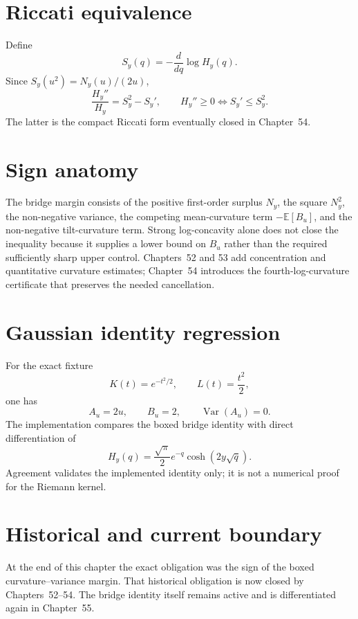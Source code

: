 \section{Riccati equivalence}
Define
\[
S_y(q)=-\frac{d}{dq}\log H_y(q).
\]
Since $S_y(u^2)=N_y(u)/(2u)$,
\[
\boxed{\frac{H_y''}{H_y}=S_y^2-S_y'},
\qquad
\boxed{H_y''\ge0\iff S_y'\le S_y^2.}
\]
The latter is the compact Riccati form eventually closed in Chapter~54.

\section{Sign anatomy}
The bridge margin consists of the positive first-order surplus $N_y$, the square $N_y^2$, the non-negative variance, the competing mean-curvature term $-\mathbb E[B_u]$, and the non-negative tilt-curvature term. Strong log-concavity alone does not close the inequality because it supplies a lower bound on $B_u$ rather than the required sufficiently sharp upper control. Chapters~52 and 53 add concentration and quantitative curvature estimates; Chapter~54 introduces the fourth-log-curvature certificate that preserves the needed cancellation.

\section{Gaussian identity regression}
For the exact fixture
\[
K(t)=e^{-t^2/2},\qquad L(t)=\frac{t^2}{2},
\]
one has
\[
A_u=2u,\qquad B_u=2,\qquad\operatorname{Var}(A_u)=0.
\]
The implementation compares the boxed bridge identity with direct differentiation of
\[
H_y(q)=\frac{\sqrt\pi}{2}e^{-q}\cosh(2y\sqrt q).
\]
Agreement validates the implemented identity only; it is not a numerical proof for the Riemann kernel.

\section{Historical and current boundary}
At the end of this chapter the exact obligation was the sign of the boxed curvature--variance margin. That historical obligation is now closed by Chapters~52--54. The bridge identity itself remains active and is differentiated again in Chapter~55.

